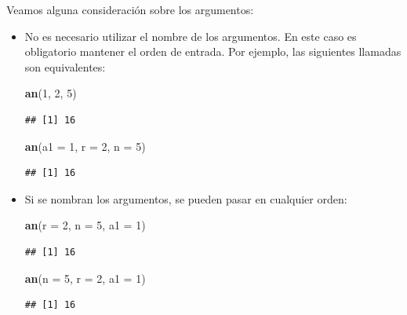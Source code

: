 \documentclass[]{book}
\newenvironment{Shaded}{\begin{snugshade}}{\end{snugshade}}
\newcommand{\KeywordTok}[1]{\textcolor[rgb]{0.13,0.29,0.53}{\textbf{#1}}}
\newcommand{\DataTypeTok}[1]{\textcolor[rgb]{0.13,0.29,0.53}{#1}}
\newcommand{\DecValTok}[1]{\textcolor[rgb]{0.00,0.00,0.81}{#1}}
\newcommand{\NormalTok}[1]{#1}
\begin{document}
Veamos alguna consideración sobre los argumentos:

\begin{itemize}
\item
  No es necesario utilizar el nombre de los argumentos. En este caso es
  obligatorio mantener el orden de entrada. Por ejemplo, las siguientes
  llamadas son equivalentes:

\begin{Shaded}
\begin{Highlighting}[]
\KeywordTok{an}\NormalTok{(}\DecValTok{1}\NormalTok{, }\DecValTok{2}\NormalTok{, }\DecValTok{5}\NormalTok{)}
\end{Highlighting}
\end{Shaded}

\begin{verbatim}
## [1] 16
\end{verbatim}

\begin{Shaded}
\begin{Highlighting}[]
\KeywordTok{an}\NormalTok{(}\DataTypeTok{a1 =} \DecValTok{1}\NormalTok{, }\DataTypeTok{r =} \DecValTok{2}\NormalTok{, }\DataTypeTok{n =} \DecValTok{5}\NormalTok{)}
\end{Highlighting}
\end{Shaded}

\begin{verbatim}
## [1] 16
\end{verbatim}
\item
  Si se nombran los argumentos, se pueden pasar en cualquier orden:

\begin{Shaded}
\begin{Highlighting}[]
\KeywordTok{an}\NormalTok{(}\DataTypeTok{r =} \DecValTok{2}\NormalTok{, }\DataTypeTok{n =} \DecValTok{5}\NormalTok{, }\DataTypeTok{a1 =} \DecValTok{1}\NormalTok{)}
\end{Highlighting}
\end{Shaded}

\begin{verbatim}
## [1] 16
\end{verbatim}

\begin{Shaded}
\begin{Highlighting}[]
\KeywordTok{an}\NormalTok{(}\DataTypeTok{n =} \DecValTok{5}\NormalTok{, }\DataTypeTok{r =} \DecValTok{2}\NormalTok{, }\DataTypeTok{a1 =} \DecValTok{1}\NormalTok{)}
\end{Highlighting}
\end{Shaded}

\begin{verbatim}
## [1] 16
\end{verbatim}
\end{itemize}
\end{document}
